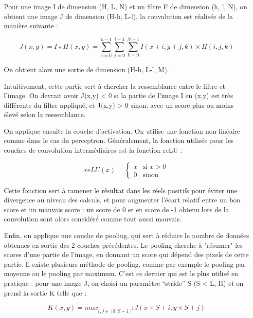 Pour une image I de dimension (H, L, N) et un filtre F de dimension (h, l, N), on obtient une image J de dimension (H-h, L-l), la convolution est réalisée de la manière suivante :

\begin{equation}
    J(x, y) = I \star H (x, y) = \sum_{i=0}^{h - 1} \sum_{j=0}^{l- 1} \sum_{k=0}^{N - 1} I(x+i, y+j, k) \times H(i, j, k)
\end{equation}

On obtient alors une sortie de dimension (H-h, L-l, M).

Intuitivement, cette partie sert à chercher la ressemblance entre le filtre et l'image.
On devrait avoir J(x,y) < 0 si la partie de l'image I en (x,y) est très différente du filtre appliqué, et J(x,y) > 0 sinon, avec un score plus ou moins élevé selon la ressemblance.


On applique ensuite la couche d'activation. On utilise une fonction non-linéaire comme dans le cas du perceptron. 
Généralement, la fonction utilisée pour les couches de convolution intermédiaires est la fonction reLU :

$$
reLU(x) = \left\{
    \begin{array}{ll}
        x & \mbox{si } x > 0 \\
        0 & \mbox{sinon}
    \end{array}
\right.
$$

\newpage 

Cette fonction sert à ramener le résultat dans les réels positifs pour éviter une divergence au niveau des calculs, et pour augmenter l'écart relatif entre un bon score et un mauvais score : un score de 0 et en score de -1 obtenu lors de la convolution sont alors considéré comme tout aussi mauvais.

Enfin, on applique une couche de pooling, qui sert à réduire le nombre de données obtenues en sortie des 2 couches précédentes.
Le pooling cherche à "résumer" les scores d'une partie de l'image, en donnant un score qui dépend des pixels de cette partie.
Il existe plusieurs méthode de pooling, comme par exemple le pooling par moyenne ou le pooling par maximum. C'est ce dernier qui est le plus utilisé en pratique :
pour une image J, on choisi un paramètre ``stride'' S (S < L, H) et on prend la sortie K telle que :

\begin{equation}
    K(x, y) = max_{i,j \in [0, S-1] ^2 } { J(x \times S + i , y \times S + j ) }
\end{equation}


